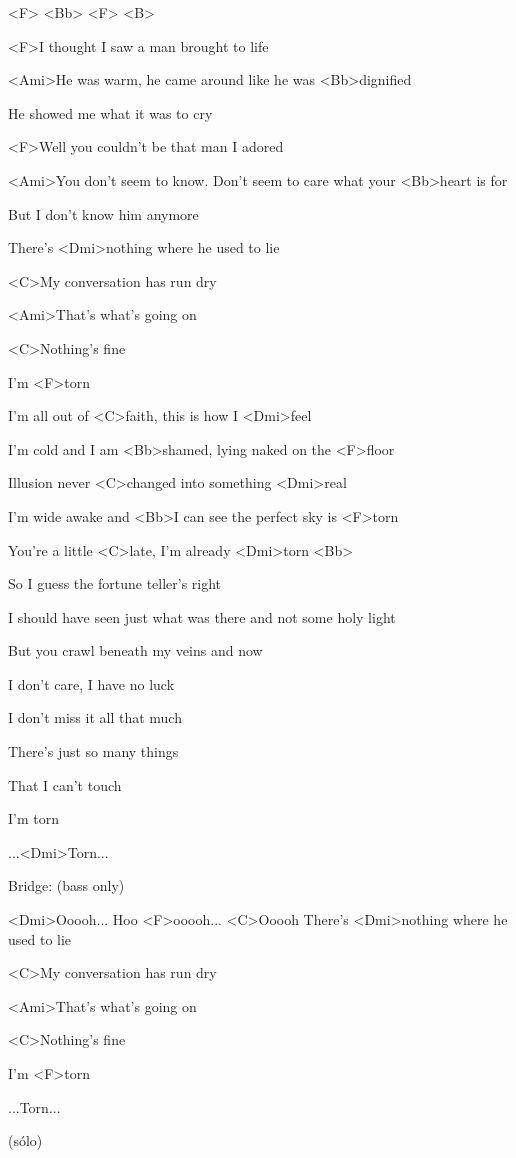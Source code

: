
<F> <Bb> <F> <B>

\zs
<F>I thought I saw a man brought to life

<Ami>He was warm, he came around like he was <Bb>dignified

He showed me what it was to cry

<F>Well you couldn't be that man I adored 

<Ami>You don't seem to know. Don't seem to care what your <Bb>heart is for

But I don't know him anymore 

There's <Dmi>nothing where he used to lie

<C>My conversation has run dry

<Ami>That's what's going on

<C>Nothing's fine

I'm <F>torn
\ks

\zr
I'm all out of <C>faith, this is how I <Dmi>feel

I'm cold and I am <Bb>shamed, lying naked on the <F>floor

Illusion never <C>changed into something <Dmi>real

I'm wide awake and <Bb>I can see the perfect sky is <F>torn

You're a little <C>late, I'm already <Dmi>torn <Bb>
\kr

\zs
So I guess the fortune teller's right

I should have seen just what was there and not some holy light

But you crawl beneath my veins and now

I don't care, I have no luck

I don't miss it all that much 

There's just so many things

That I can't touch

I'm torn
\ks

\zr
\kr
...<Dmi>Torn...

Bridge: (bass only)

<Dmi>Ooooh... Hoo <F>ooooh... <C>Ooooh
\zs
There's <Dmi>nothing where he used to lie

<C>My conversation has run dry

<Ami>That's what's going on

<C>Nothing's fine

I'm <F>torn
\ks

\zr
\kr
...Torn...

\zr
(sólo)
\kr

\kp

